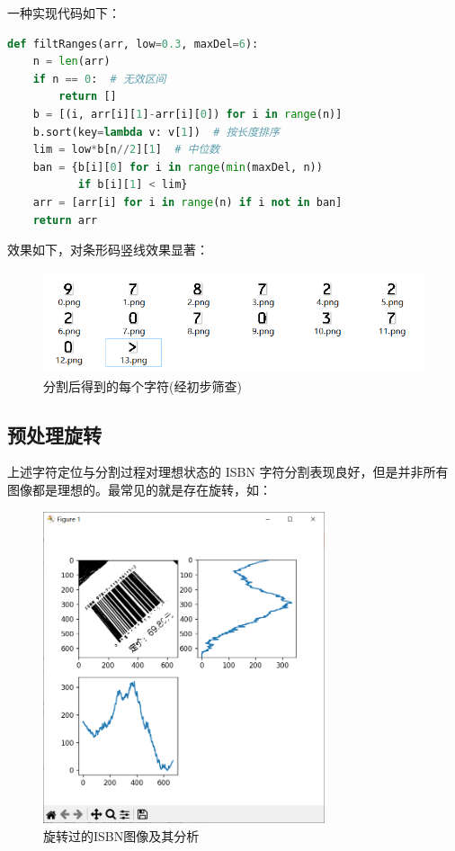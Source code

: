 \documentclass{ctexart}
\begin{document}
一种实现代码如下：
\begin{lstlisting}[language=python]
def filtRanges(arr, low=0.3, maxDel=6):
    n = len(arr)
    if n == 0:  # 无效区间
        return []
    b = [(i, arr[i][1]-arr[i][0]) for i in range(n)]
    b.sort(key=lambda v: v[1])  # 按长度排序
    lim = low*b[n//2][1]  # 中位数
    ban = {b[i][0] for i in range(min(maxDel, n))
           if b[i][1] < lim}
    arr = [arr[i] for i in range(n) if i not in ban]
    return arr
\end{lstlisting}

效果如下，对条形码竖线效果显著：
\begin{figure}[H]
    \centering
    \includegraphics[height=85pt]{sample_splitNum_flit}
    \caption{分割后得到的每个字符(经初步筛查)}
\end{figure}

\subsection{预处理旋转}
上述字符定位与分割过程对理想状态的 ISBN 字符分割表现良好，但是并非所有图像都是理想的。最常见的就是存在旋转，如：

\begin{figure}[H]
    \centering
    \includegraphics[height=260pt]{isbn_rotated}
    \caption{旋转过的ISBN图像及其分析}
\end{figure}
\end{document}
